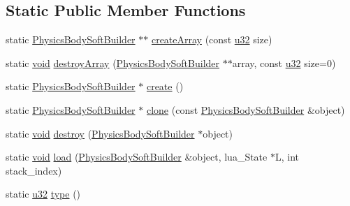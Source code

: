 \subsection*{Static Public Member Functions}
\begin{DoxyCompactItemize}
\item 
static \mbox{\hyperlink{classnjli_1_1_physics_body_soft_builder}{Physics\+Body\+Soft\+Builder}} $\ast$$\ast$ \mbox{\hyperlink{classnjli_1_1_physics_body_soft_builder_ae084ba415196ba8405e63848904b6684}{create\+Array}} (const \mbox{\hyperlink{_util_8h_a10e94b422ef0c20dcdec20d31a1f5049}{u32}} size)
\item 
static \mbox{\hyperlink{_thread_8h_af1e856da2e658414cb2456cb6f7ebc66}{void}} \mbox{\hyperlink{classnjli_1_1_physics_body_soft_builder_ab732d7732fdd85876a05a5905ab96e57}{destroy\+Array}} (\mbox{\hyperlink{classnjli_1_1_physics_body_soft_builder}{Physics\+Body\+Soft\+Builder}} $\ast$$\ast$array, const \mbox{\hyperlink{_util_8h_a10e94b422ef0c20dcdec20d31a1f5049}{u32}} size=0)
\item 
static \mbox{\hyperlink{classnjli_1_1_physics_body_soft_builder}{Physics\+Body\+Soft\+Builder}} $\ast$ \mbox{\hyperlink{classnjli_1_1_physics_body_soft_builder_ab70e1bf497a340d25921592ee9191cad}{create}} ()
\item 
static \mbox{\hyperlink{classnjli_1_1_physics_body_soft_builder}{Physics\+Body\+Soft\+Builder}} $\ast$ \mbox{\hyperlink{classnjli_1_1_physics_body_soft_builder_a8aa659a234c78f56e03ef5bae4d4903a}{clone}} (const \mbox{\hyperlink{classnjli_1_1_physics_body_soft_builder}{Physics\+Body\+Soft\+Builder}} \&object)
\item 
static \mbox{\hyperlink{_thread_8h_af1e856da2e658414cb2456cb6f7ebc66}{void}} \mbox{\hyperlink{classnjli_1_1_physics_body_soft_builder_aeeef04cdc3809b35bea315517715a01e}{destroy}} (\mbox{\hyperlink{classnjli_1_1_physics_body_soft_builder}{Physics\+Body\+Soft\+Builder}} $\ast$object)
\item 
static \mbox{\hyperlink{_thread_8h_af1e856da2e658414cb2456cb6f7ebc66}{void}} \mbox{\hyperlink{classnjli_1_1_physics_body_soft_builder_a00e2bafe1620c6d6ee2ccd1719931103}{load}} (\mbox{\hyperlink{classnjli_1_1_physics_body_soft_builder}{Physics\+Body\+Soft\+Builder}} \&object, lua\+\_\+\+State $\ast$L, int stack\+\_\+index)
\item 
static \mbox{\hyperlink{_util_8h_a10e94b422ef0c20dcdec20d31a1f5049}{u32}} \mbox{\hyperlink{classnjli_1_1_physics_body_soft_builder_aa048da2b8737da157b54153587db7f5d}{type}} ()
\end{DoxyCompactItemize}
